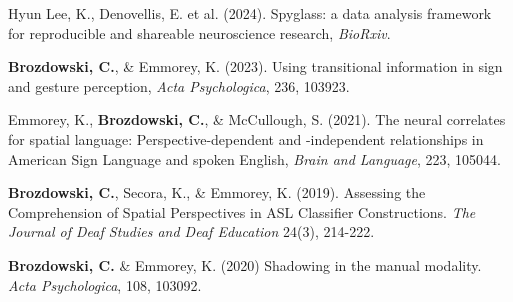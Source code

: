 

\par
\begin{cvparagraphlist}
  Hyun Lee, K., Denovellis, E. et al. (2024). Spyglass: a data analysis framework for reproducible and shareable neuroscience research, \textit{BioRxiv}. \par
  \textbf{Brozdowski, C.}, \& Emmorey, K. (2023). Using transitional information in sign and gesture perception, \textit{Acta Psychologica}, 236, 103923. \par
  Emmorey, K., \textbf{Brozdowski, C.}, \& McCullough, S. (2021). The neural correlates for spatial language: Perspective-dependent and -independent relationships in American Sign Language and spoken English, \textit{Brain and Language}, 223, 105044. \par 
  \textbf{Brozdowski, C.}, Secora, K., \& Emmorey, K. (2019). Assessing the Comprehension of Spatial Perspectives in ASL Classifier Constructions. \textit{The Journal of Deaf Studies and Deaf Education} 24(3), 214-222. \par 
  \textbf{Brozdowski, C.} \& Emmorey, K. (2020) Shadowing in the manual modality. \textit{Acta Psychologica}, 108, 103092. \par 
\end{cvparagraphlist}

